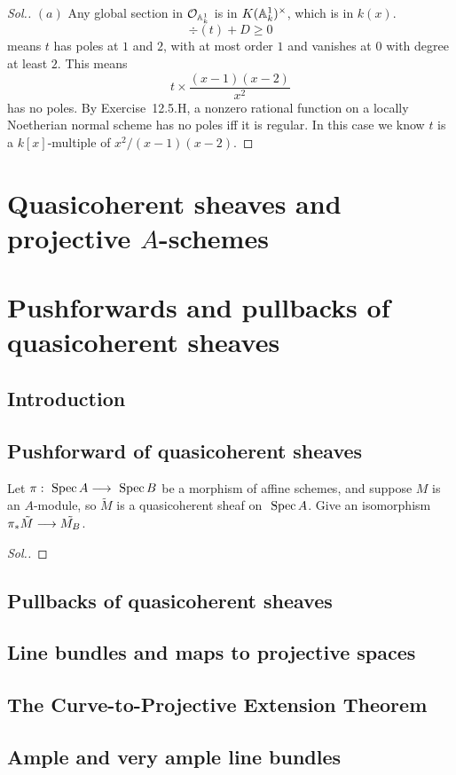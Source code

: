\documentclass[11pt]{book} %
\begin{document}
\begin{proof}[Sol.]
$(a)$ Any global section in ${\cal O}_{\mathbb A^1_k}$ is in $K(\mathbb A^1_k)^\times$, which is in $k(x)$. 
$$
\div(t)+D\geq 0
$$
means $t$ has poles at $1$ and $2$, with at most order $1$ and vanishes at $0$ with degree at least $2$. This means 
$$
t\times \frac{(x-1)(x-2)}{x^2}
$$
has no poles.
By Exercise~12.5.H, a nonzero rational function on a locally Noetherian normal scheme has no poles iff it is regular. In this case
we know $t$ is a $k[x]$-multiple of $x^2/(x-1)(x-2).$
\end{proof}
\chapter{Quasicoherent sheaves and projective $A$-schemes}
\chapter{Pushforwards and pullbacks of quasicoherent sheaves}
\section{Introduction}
\section{Pushforward of quasicoherent sheaves}
\begin{exr}
Let $\pi:\text{ Spec\,} A\longrightarrow \text{ Spec\,} B$ be a morphism of affine schemes, and suppose $M$ is an $A$-module, so $\tilde{M}$ is  a quasicoherent sheaf on $\text{ Spec\,} A$. Give an isomorphism $\pi_*\tilde{M}\longrightarrow \tilde{M_B}$.
\end{exr}
\begin{proof}[Sol.]

\end{proof}
\section{Pullbacks of quasicoherent sheaves}
\section{Line bundles and maps to projective spaces}
\section{The Curve-to-Projective Extension Theorem
}
\section{Ample and very ample line bundles}
\end{document}
